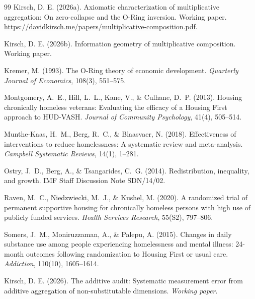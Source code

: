 \documentclass[12pt]{article}
\begin{document}
\begin{thebibliography}{99}
Kirsch, D. E. (2026a).
Axiomatic characterization of multiplicative aggregation: On zero-collapse and the O-Ring inversion.
Working paper. \url{https://davidkirsch.me/papers/multiplicative-composition.pdf}.

Kirsch, D. E. (2026b).
Information geometry of multiplicative composition.
Working paper.

Kremer, M. (1993).
The O-Ring theory of economic development.
\emph{Quarterly Journal of Economics}, 108(3), 551--575.

Montgomery, A.~E., Hill, L.~L., Kane, V., \& Culhane, D.~P. (2013).
Housing chronically homeless veterans: Evaluating the efficacy of a Housing First approach to HUD-VASH.
\emph{Journal of Community Psychology}, 41(4), 505--514.

Munthe-Kaas, H.~M., Berg, R.~C., \& Blaasvaer, N. (2018).
Effectiveness of interventions to reduce homelessness: A systematic review and meta-analysis.
\emph{Campbell Systematic Reviews}, 14(1), 1--281.

Ostry, J.~D., Berg, A., \& Tsangarides, C.~G. (2014).
Redistribution, inequality, and growth.
IMF Staff Discussion Note SDN/14/02.

Raven, M.~C., Niedzwiecki, M.~J., \& Kushel, M. (2020).
A randomized trial of permanent supportive housing for chronically homeless persons with high use of publicly funded services.
\emph{Health Services Research}, 55(S2), 797--806.

Somers, J.~M., Moniruzzaman, A., \& Palepu, A. (2015).
Changes in daily substance use among people experiencing homelessness and mental illness: 24-month outcomes following randomization to Housing First or usual care.
\emph{Addiction}, 110(10), 1605--1614.

Kirsch, D. E. (2026). The additive audit: Systematic measurement error from additive aggregation of non-substitutable dimensions. \textit{Working paper}.

\end{thebibliography}
\end{document}
